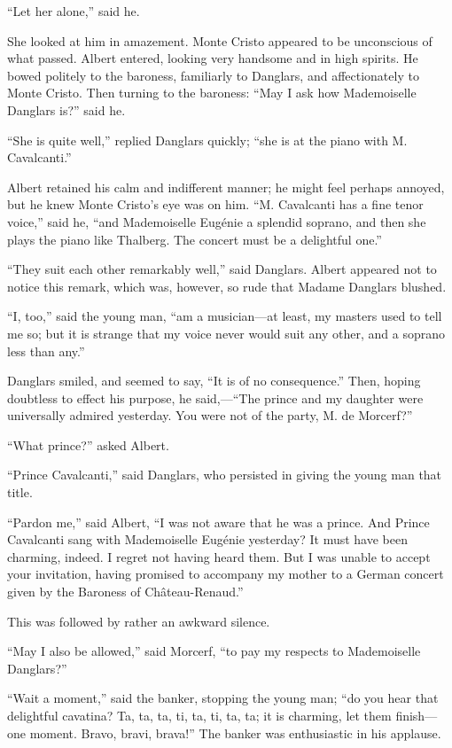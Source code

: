 “Let her alone,” said he.

She looked at him in amazement. Monte Cristo appeared to be unconscious
of what passed. Albert entered, looking very handsome and in high
spirits. He bowed politely to the baroness, familiarly to Danglars, and
affectionately to Monte Cristo. Then turning to the baroness: “May I
ask how Mademoiselle Danglars is?” said he.

“She is quite well,” replied Danglars quickly; “she is at the piano
with M. Cavalcanti.”

Albert retained his calm and indifferent manner; he might feel perhaps
annoyed, but he knew Monte Cristo’s eye was on him. “M. Cavalcanti has
a fine tenor voice,” said he, “and Mademoiselle Eugénie a splendid
soprano, and then she plays the piano like Thalberg. The concert must
be a delightful one.”

“They suit each other remarkably well,” said Danglars. Albert appeared
not to notice this remark, which was, however, so rude that Madame
Danglars blushed.

“I, too,” said the young man, “am a musician—at least, my masters used
to tell me so; but it is strange that my voice never would suit any
other, and a soprano less than any.”

Danglars smiled, and seemed to say, “It is of no consequence.” Then,
hoping doubtless to effect his purpose, he said,—“The prince and my
daughter were universally admired yesterday. You were not of the party,
M. de Morcerf?”

“What prince?” asked Albert.

“Prince Cavalcanti,” said Danglars, who persisted in giving the young
man that title.

“Pardon me,” said Albert, “I was not aware that he was a prince. And
Prince Cavalcanti sang with Mademoiselle Eugénie yesterday? It must
have been charming, indeed. I regret not having heard them. But I was
unable to accept your invitation, having promised to accompany my
mother to a German concert given by the Baroness of Château-Renaud.”

This was followed by rather an awkward silence.

“May I also be allowed,” said Morcerf, “to pay my respects to
Mademoiselle Danglars?”

“Wait a moment,” said the banker, stopping the young man; “do you hear
that delightful cavatina? Ta, ta, ta, ti, ta, ti, ta, ta; it is
charming, let them finish—one moment. Bravo, bravi, brava!” The banker
was enthusiastic in his applause.

